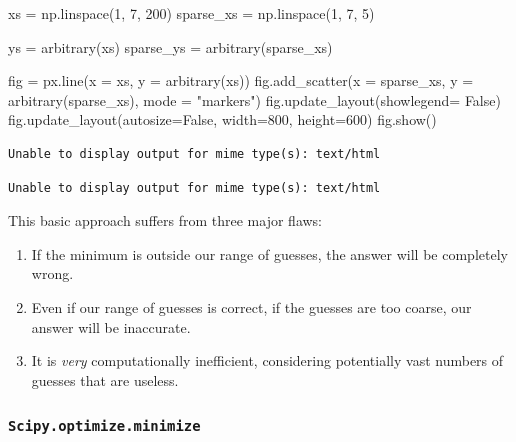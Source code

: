 \documentclass[
  letterpaper,
  DIV=11,
  numbers=noendperiod]{scrreprt}
\newenvironment{Shaded}{\begin{snugshade}}{\end{snugshade}}
\newcommand{\DecValTok}[1]{\textcolor[rgb]{0.68,0.00,0.00}{#1}}
\newcommand{\NormalTok}[1]{\textcolor[rgb]{0.00,0.23,0.31}{#1}}
\newcommand{\OperatorTok}[1]{\textcolor[rgb]{0.37,0.37,0.37}{#1}}
\newcommand{\StringTok}[1]{\textcolor[rgb]{0.13,0.47,0.30}{#1}}
\newcommand{\VariableTok}[1]{\textcolor[rgb]{0.07,0.07,0.07}{#1}}
\providecommand{\tightlist}{%
  \setlength{\itemsep}{0pt}\setlength{\parskip}{0pt}}\usepackage{longtable,booktabs,array}
\begin{document}
\begin{Shaded}
\begin{Highlighting}[]
\NormalTok{xs }\OperatorTok{=}\NormalTok{ np.linspace(}\DecValTok{1}\NormalTok{, }\DecValTok{7}\NormalTok{, }\DecValTok{200}\NormalTok{)}
\NormalTok{sparse\_xs }\OperatorTok{=}\NormalTok{ np.linspace(}\DecValTok{1}\NormalTok{, }\DecValTok{7}\NormalTok{, }\DecValTok{5}\NormalTok{)}

\NormalTok{ys }\OperatorTok{=}\NormalTok{ arbitrary(xs)}
\NormalTok{sparse\_ys }\OperatorTok{=}\NormalTok{ arbitrary(sparse\_xs)}

\NormalTok{fig }\OperatorTok{=}\NormalTok{ px.line(x }\OperatorTok{=}\NormalTok{ xs, y }\OperatorTok{=}\NormalTok{ arbitrary(xs))}
\NormalTok{fig.add\_scatter(x }\OperatorTok{=}\NormalTok{ sparse\_xs, y }\OperatorTok{=}\NormalTok{ arbitrary(sparse\_xs), mode }\OperatorTok{=} \StringTok{"markers"}\NormalTok{)}
\NormalTok{fig.update\_layout(showlegend}\OperatorTok{=} \VariableTok{False}\NormalTok{)}
\NormalTok{fig.update\_layout(autosize}\OperatorTok{=}\VariableTok{False}\NormalTok{, width}\OperatorTok{=}\DecValTok{800}\NormalTok{, height}\OperatorTok{=}\DecValTok{600}\NormalTok{)}
\NormalTok{fig.show()}
\end{Highlighting}
\end{Shaded}

\begin{verbatim}
Unable to display output for mime type(s): text/html
\end{verbatim}

\begin{verbatim}
Unable to display output for mime type(s): text/html
\end{verbatim}

This basic approach suffers from three major flaws:

\begin{enumerate}
\def\labelenumi{\arabic{enumi}.}
\tightlist
\item
  If the minimum is outside our range of guesses, the answer will be
  completely wrong.
\item
  Even if our range of guesses is correct, if the guesses are too
  coarse, our answer will be inaccurate.
\item
  It is \emph{very} computationally inefficient, considering potentially
  vast numbers of guesses that are useless.
\end{enumerate}

\subsubsection{\texorpdfstring{\texttt{Scipy.optimize.minimize}}{Scipy.optimize.minimize}}\label{scipy.optimize.minimize}
\end{document}
